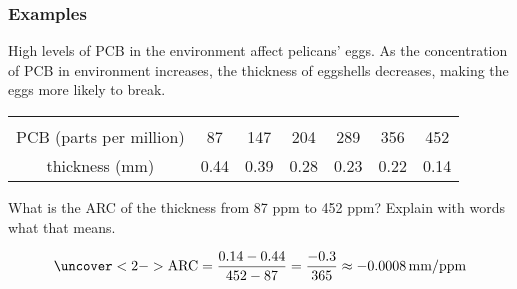 \documentclass[9pt,xcolor=x11names,compress]{beamer}
\begin{document}
\begin{frame}[c]\frametitle{Examples}
    
\begin{example}
\alert{High levels of PCB in the environment affect pelicans' eggs.  As the concentration of PCB in environment increases, the thickness of eggshells decreases, making the eggs more likely to break.}

\begin{center}
	\begin{tabular}{|c||c|c|c|c|c|c|}	
	\rowcolor{DeepSkyBlue4}	
	&&&&&&\\
	PCB (parts per million) & 87 & 147 & 204 & 289 & 356 & 452 \\
	thickness (mm) & 0.44 & 0.39 & 0.28 & 0.23 & 0.22 & 0.14
	\end{tabular}
\end{center}
\alert{What is the ARC of the thickness from 87 ppm to 452 ppm?  Explain with words what that means.}
	
\begin{equation*}
\uncover<2->{\text{ARC} = \frac{0.14 - 0.44}{452 - 87} = \frac{-0.3}{365} \approx -0.0008\, \text{mm}/\text{ppm}}
\end{equation*}


\end{example}

\end{frame}
\end{document}
